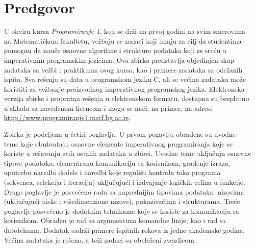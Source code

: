 \chapter*{Predgovor}

U okviru kursa {\em Programiranje 1}, koji se drži na prvoj godini na svim smerovima na Matematičkom fakultetu, vežbaju se zadaci koji imaju za cilj da studentima pomognu da nauče osnovne algoritme i strukture podataka koji se sreću u imperativnim programskim jezicima. Ova zbirka predstavlja objedinjen skup zadataka sa vežbi i praktikuma ovog kursa, kao i primere zadataka sa održanih ispita. Sva rešenja su data u programskom jeziku C, ali se većina zadataka može koristiti za vežbanje proizvoljnog imperativnog programskog jezika.
Elektronska verzija zbirke i propratna rešenja u elektronskom formatu, dostupna su besplatno u skladu sa navedenom licencom i mogu se naći, na primer, na adresi \url{http://www.programiranje1.matf.bg.ac.rs}.

Zbirka je podeljena u četiri poglavlja. U prvom pogavlju obrađene su uvodne teme koje obuhvataju osnovne elemente imperativnog programiranja koje se koriste u rešavanju svih ostalih zadataka u zbirci. Uvodne teme uključuju osnovne tipove podataka, elementranu komunikaciju sa korisnikom, građenje izraza, upotrebu naredbi dodele i naredbi koje regulišu kontrolu toka programa (sekvenca, selekcija i iteracija) uključujući i izdvajanje logičkih celina u funkcije. Drugo poglavlje je posvećeno radu sa naprednijim tipovima podataka: nizovima (uključujući niske i višedimenzione nizove), pokazivačima i strukturama. Treće poglavlje posvećeno je dodatnim tehnikama koje se koriste za komunikaciju sa korisnikom. Obrađen je rad sa argumentima komandne linije, kao i rad sa datotekama. Dodatak sadrži primere ispitnih rokova iz jedne akademske godine. Većina zadataka je rešena, a teži zadaci su obeleženi zvezdicom.

